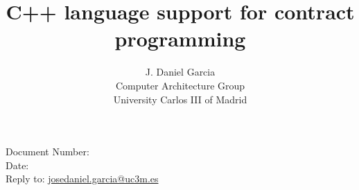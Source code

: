 \documentclass[10pt,a4paper,oneside,final,notitlepage]{article}%
\begin{document}


\begin{flushright}
Document Number: \texttt{\paperid}\\
Date: \paperdate\\
Reply to: \url{josedaniel.garcia@uc3m.es}
\end{flushright}

\title{C++ language support for contract programming}
\author{J. Daniel Garcia\\
Computer Architecture Group\\
University Carlos III of Madrid\\
}
\date{}

\begingroup
\let\newpage\relax%
\maketitle
\endgroup





\end{document}
